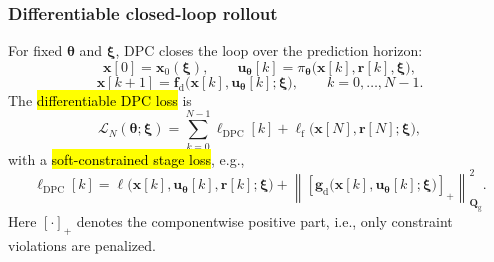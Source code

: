 \begin{frame}
	\frametitle{Differentiable closed-loop rollout}
	For fixed $\bm{\theta}$ and $\bm{\xi}$, DPC closes the loop over the prediction horizon:
	\begin{equation}
		\bm{x}[0]=\bm{x}_0(\bm{\xi}),\qquad
		\bm{u}_{\bm{\theta}}[k]=\pi_{\bm{\theta}}\bigl(\bm{x}[k],\bm{r}[k],\bm{\xi}\bigr),
	\end{equation}
	\begin{equation}
		\bm{x}[k+1]=\bm{f}_{\mathrm{d}}\bigl(\bm{x}[k],\bm{u}_{\bm{\theta}}[k];\bm{\xi}\bigr),
		\qquad k=0,\ldots,N-1.
	\end{equation}\pause%
	The \hl{differentiable DPC loss} is
	\begin{equation}
		\mathcal{L}_{N}(\bm{\theta};\bm{\xi})
		=\sum_{k=0}^{N-1}\ell_{\mathrm{DPC}}[k]+\ell_{\mathrm{f}}\bigl(\bm{x}[N],\bm{r}[N];\bm{\xi}\bigr),
	\end{equation}\pause%
	with a \hl{soft-constrained stage loss}, e.g.,
	\begin{equation}
		\ell_{\mathrm{DPC}}[k]
		=\ell\bigl(\bm{x}[k],\bm{u}_{\bm{\theta}}[k],\bm{r}[k];\bm{\xi}\bigr)
		+\left\|\left[\bm{g}_{\mathrm{d}}\bigl(\bm{x}[k],\bm{u}_{\bm{\theta}}[k];\bm{\xi}\bigr)\right]_{+}\right\|_{\bm{Q}_{\mathrm{g}}}^{2}.
	\end{equation}\pause%
	Here $[\cdot]_+$ denotes the componentwise positive part, i.e., only constraint violations are penalized.
\end{frame}



